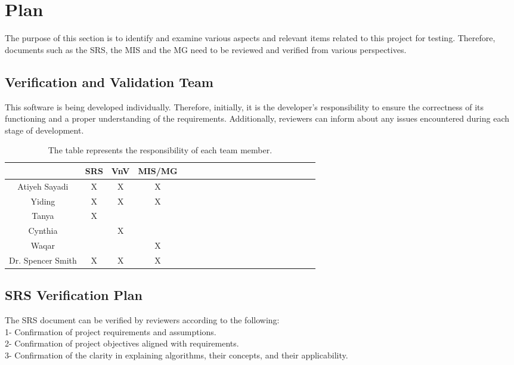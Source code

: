 \documentclass[12pt, titlepage]{article}
\begin{document}
\section{Plan}
The purpose of this section is to identify and examine various aspects and relevant items related to this project for testing. Therefore, documents such as the SRS, the  MIS and the MG need to be reviewed and verified from various perspectives.

\subsection{Verification and Validation Team}

This software is being developed individually. Therefore, initially, it is the developer's responsibility to ensure the correctness of its functioning and a proper understanding of the requirements. Additionally, reviewers can inform about any issues encountered during each stage of development.


\begin{table}[h!]
\centering
\begin{tabular}{|c|c|c|c|c|c|c|c|c|c|c|c|c|c|c|c|c|c|c|c|}
\hline
	& \textbf{SRS }& \textbf{VnV}& \textbf{MIS/MG} \\
\hline
Atiyeh Sayadi& X& X& X \\ \hline
Yiding& X& X& X \\ \hline
Tanya & X& & \\ \hline
Cynthia& & X& \\ \hline
Waqar& & & X \\ \hline
Dr. Spencer Smith& X& X& X \\ \hline
\end{tabular}
\caption{The table represents the responsibility of each team member. }
\label{Table:2}
\end{table}

\subsection{SRS Verification Plan}

The SRS document can be verified by reviewers according to the following:\\
1- Confirmation of project requirements and assumptions.\\
2- Confirmation of project objectives aligned with requirements.\\
3- Confirmation of the clarity in explaining algorithms, their concepts, and their applicability.\\
\end{document}
